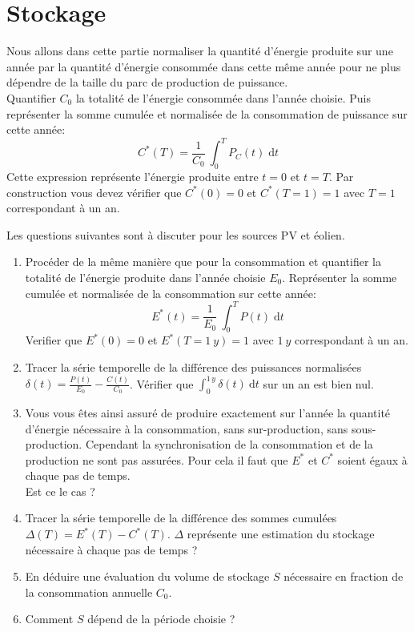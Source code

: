 \documentclass[12pt,a4,french]{article}
\begin{document}
\section{Stockage}
Nous allons dans cette partie normaliser la quantité d'énergie produite sur une année par la quantité d'énergie consommée dans cette même année pour ne plus dépendre de la taille du parc de production de puissance. \\
Quantifier $C_0$ la totalité de l'énergie consommée dans l'année choisie. Puis  représenter la somme cumulée et normalisée de la consommation de puissance sur cette année:
\begin{equation}
	C^*(T)  = \frac{1}{C_0} ~ \int_{0}^{T}P_C(t) \; \text{d} t	
\end{equation}
Cette expression représente l'énergie produite entre $t=0$ et $t=T$. Par construction vous devez vérifier que $C^*(0)=0$ et $C^*(T=1)=1$ avec $T=1$ correspondant à un an. 


Les questions suivantes sont à discuter pour les sources PV et éolien.
\begin{enumerate}
	\item Procéder de la même manière que pour la consommation et quantifier la totalité de l'énergie produite dans l'année choisie $E_0$. Représenter la somme cumulée et normalisée de la consommation sur cette année: 
	\begin{equation}
		E^*(t)  = \frac{1}{E_0} ~ \int_{0}^{T} P(t) \; \text{d} t	
	\end{equation}
	Verifier que $E^*(0)=0$ et $E^*(T=1~y)=1$ avec $1~y$ correspondant à un an. 
	
	\item Tracer la série temporelle de la différence des puissances normalisées $\delta(t) = \frac{P(t)}{E_0} - \frac{C(t)}{C_0}$. Vérifier que $\int_0^{1\,y} \delta(t) ~ \text{d} t $ sur un an est bien nul.
	
	\item Vous vous êtes ainsi assuré de produire exactement sur l'année la quantité d'énergie nécessaire à la consommation, sans sur-production, sans sous-production. Cependant la synchronisation de la consommation et de la production ne sont pas assurées. Pour cela il faut que $E^*$ et $C^*$ soient égaux à chaque pas de temps.\\ Est ce le cas ? 
	
	\item Tracer la série temporelle de la différence des sommes cumulées $\Delta(T) = E^*(T) - C^*(T)$. $\Delta $ représente une estimation du stockage nécessaire à chaque pas de temps ?
	
	\item En déduire une évaluation du volume de stockage $S$ nécessaire en fraction de la consommation annuelle $C_0$.
	
	\item Comment $S$ dépend de la période choisie ?
	
\end{enumerate}
\end{document}
